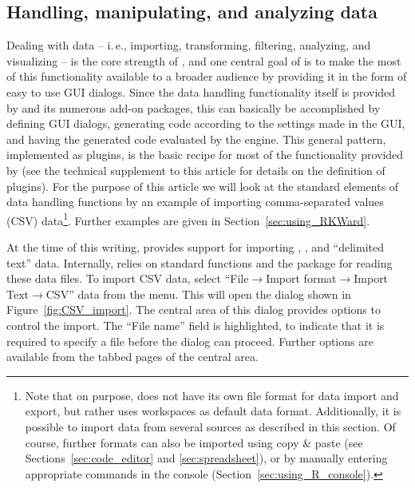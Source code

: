 \subsection{Handling, manipulating, and analyzing data}
\label{sec:analyzing_data}

Dealing with data -- i.\,e., importing, transforming, filtering, analyzing, and visualizing  --
is the core strength of , and one central goal of
 is to make the most of this functionality available to a broader
audience by providing it in the form of easy to use GUI dialogs. Since
the data handling functionality itself is provided by
 and its numerous add-on packages, this
can basically be accomplished by defining GUI dialogs, generating
 code according to the settings made in
the GUI, and having the generated code evaluated by the
 engine. 
This general pattern, implemented as plugins, is the
basic recipe for most of the functionality provided by 
(see the technical supplement to this article for details on the definition of plugins). For
the purpose of this article we will look at the standard
elements of data handling functions by an example of importing comma-separated values (CSV)
data\footnote {
  Note that on purpose,  does not have its
  own file format for data import and export, but rather uses
   workspaces as default data format. Additionally, it is possible
  to import data from several sources as described in this section. Of course, further formats can
  also be imported using copy \& paste (see Sections~\ref{sec:code_editor} and \ref{sec:spreadsheet}), or by
  manually entering appropriate  commands in
  the  console (Section~\ref{sec:using_R_console}).
}. Further examples are given in Section~\ref{sec:using_RKWard}.

At the time of this writing,  provides support for importing ,
, and ``delimited text'' data. Internally, 
relies on standard  functions and the package 
\citep{Murdoch2002} for reading these data files. To import CSV data,
select ``File$\rightarrow$Import format$\rightarrow$Import Text$\rightarrow$CSV''
data from the menu. This will open the dialog shown in
Figure~\ref{fig:CSV_import}. The central area of this dialog provides 
options to control the import. The 
``File name'' field is highlighted, to indicate that
it is required to specify a file before the dialog can proceed.
Further options are available from the tabbed pages of the central area.

